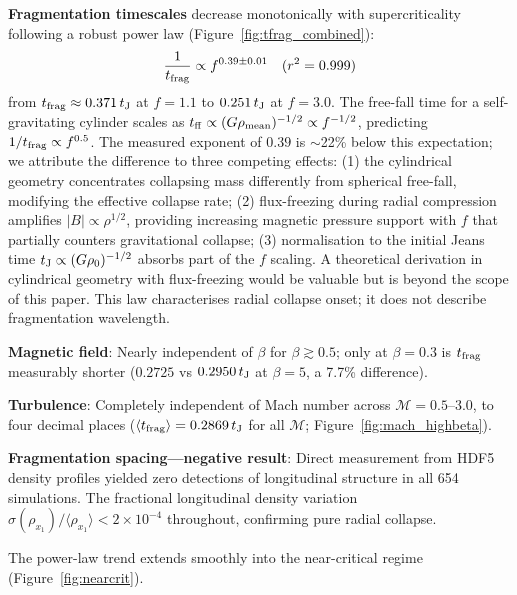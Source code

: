 \documentclass[twoside,twocolumn]{mnras}
\begin{document}
\textbf{Fragmentation timescales} decrease monotonically with supercriticality following
a robust power law (Figure~\ref{fig:tfrag_combined}):
\begin{equation}
\frac{1}{t_{\rm frag}} \propto f^{0.39 \pm 0.01} \quad (r^2 = 0.999)
\label{eq:powerlaw}
\end{equation}
from $t_{\rm frag} \approx 0.371\,t_{\rm J}$ at $f = 1.1$ to $0.251\,t_{\rm J}$ at
$f = 3.0$. The free-fall time for a self-gravitating cylinder scales as
$t_{\rm ff} \propto (G\rho_{\rm mean})^{-1/2} \propto f^{-1/2}$, predicting
$1/t_{\rm frag} \propto f^{0.5}$. The measured exponent of $0.39$ is $\sim$22\% below
this expectation; we attribute the difference to three competing effects: (1) the
cylindrical geometry concentrates collapsing mass differently from spherical free-fall,
modifying the effective collapse rate; (2) flux-freezing during radial compression
amplifies $|B| \propto \rho^{1/2}$, providing increasing magnetic pressure support
with $f$ that partially counters gravitational collapse; (3) normalisation to the
initial Jeans time $t_{\rm J} \propto (G\rho_0)^{-1/2}$ absorbs part of the $f$
scaling. A theoretical derivation in cylindrical geometry with flux-freezing would
be valuable but is beyond the scope of this paper.
This law characterises radial collapse onset; it does not describe fragmentation wavelength.

\textbf{Magnetic field}: Nearly independent of $\beta$ for $\beta \gtrsim 0.5$; only
at $\beta = 0.3$ is $t_{\rm frag}$ measurably shorter ($0.2725$ vs $0.2950\,t_{\rm J}$
at $\beta = 5$, a 7.7\% difference).

\textbf{Turbulence}: Completely independent of Mach number across $\mathcal{M} = 0.5$--$3.0$,
to four decimal places ($\langle t_{\rm frag} \rangle = 0.2869\,t_{\rm J}$ for all $\mathcal{M}$;
Figure~\ref{fig:mach_highbeta}).

\textbf{Fragmentation spacing---negative result}: Direct measurement from HDF5 density
profiles yielded zero detections of longitudinal structure in all 654 simulations.
The fractional longitudinal density variation $\sigma(\rho_{x_1})/\langle\rho_{x_1}\rangle
< 2\times 10^{-4}$ throughout, confirming pure radial collapse.

The power-law trend extends smoothly into the near-critical regime
(Figure~\ref{fig:nearcrit}).
\end{document}

